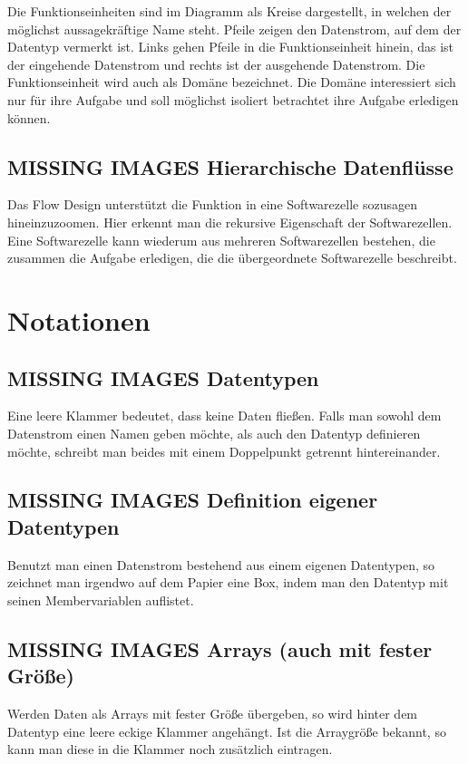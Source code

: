 \documentclass[a4paper,12pt,oneside]{book}
\begin{document}
Die Funktionseinheiten sind im Diagramm als Kreise dargestellt, in welchen der möglichst aussagekräftige Name steht.
Pfeile zeigen den Datenstrom, auf dem der Datentyp vermerkt ist.
Links gehen Pfeile in die Funktionseinheit hinein, das ist der eingehende Datenstrom und rechts ist der ausgehende Datenstrom.
Die Funktionseinheit wird auch als Domäne bezeichnet. Die Domäne interessiert sich nur für ihre Aufgabe und soll möglichst isoliert
betrachtet ihre Aufgabe erledigen können.
\section{MISSING IMAGES Hierarchische Datenflüsse}
\label{sec-2-2}
Das Flow Design unterstützt die Funktion in eine Softwarezelle sozusagen hineinzuzoomen.
Hier erkennt man die rekursive Eigenschaft der Softwarezellen. Eine Softwarezelle kann wiederum aus mehreren Softwarezellen bestehen,
die zusammen die Aufgabe erledigen, die die übergeordnete Softwarezelle beschreibt.


\chapter{Notationen}
\label{sec-3}
\section{MISSING IMAGES Datentypen}
\label{sec-3-1}

Eine leere Klammer bedeutet, dass keine Daten fließen.
Falls man sowohl dem Datenstrom einen Namen geben möchte, als auch den Datentyp definieren möchte, schreibt man beides mit einem
Doppelpunkt getrennt hintereinander.
\section{MISSING IMAGES Definition eigener Datentypen}
\label{sec-3-2}
Benutzt man einen Datenstrom bestehend aus einem eigenen Datentypen, so zeichnet man irgendwo auf dem Papier eine Box,
indem man den Datentyp mit seinen Membervariablen auflistet.

\section{MISSING IMAGES Arrays (auch mit fester Größe)}
\label{sec-3-3}
Werden Daten als Arrays mit fester Größe übergeben, so wird hinter dem Datentyp eine leere eckige Klammer angehängt.
Ist die Arraygröße bekannt, so kann man diese in die Klammer noch zusätzlich eintragen.
\end{document}
